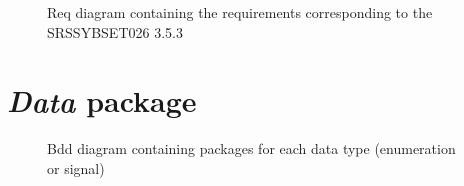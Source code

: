 \documentclass{template/openetcs_report}
\newcommand\packageName[1]{\emph{#1}}
\begin{document}
\begin{figure}[H]
  \centering
  \caption{Req diagram containing the requirements corresponding to the SRSSYBSET026 3.5.3}
  \label{fig:Subset026-3.5.3_Requirements}
\end{figure}

\section{\packageName{Data} package} \label{chap:DataPackage}

\begin{figure}[H]
  \centering
  \caption{Bdd diagram containing packages for each data type (enumeration or signal)}
  \label{fig:Interface}
\end{figure}
\end{document}
